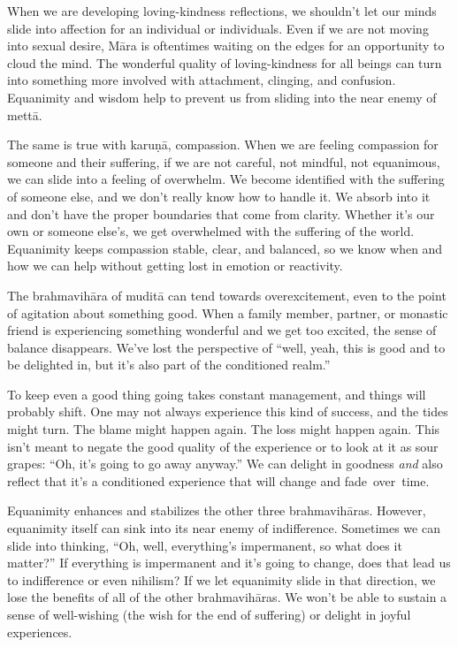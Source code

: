 When we are developing loving-kindness reflections, we shouldn't let our minds slide into affection for an individual or individuals. Even if we are not moving into sexual desire, Māra is oftentimes waiting on the edges for an opportunity to cloud the mind. The wonderful quality of loving-kindness for all beings can turn into something more involved with attachment, clinging, and confusion. Equanimity and wisdom help to prevent us from sliding into the near enemy of mettā.

The same is true with karuṇā, compassion. When we are feeling compassion for someone and their suffering, if we are not careful, not mindful, not equanimous, we can slide into a feeling of overwhelm. We become identified with the suffering of someone else, and we don't really know how to handle it. We absorb into it and don't have the proper boundaries that come from clarity. Whether it's our own or someone else's, we get overwhelmed with the suffering of the world. Equanimity keeps compassion stable, clear, and balanced, so we know when and how we can help without getting lost in emotion or reactivity.

The brahmavihāra of muditā can tend towards overexcitement, even to the point of agitation about something good. When a family member, partner, or monastic friend is experiencing something wonderful and we get too excited, the sense of balance disappears. We've lost the perspective of ``well, yeah, this is good and to be delighted in, but it's also part of the conditioned realm.''

To keep even a good thing going takes constant management, and things will probably shift. One may not always experience this kind of success, and the tides might turn. The blame might happen again. The loss might happen again. This isn't meant to negate the good quality of the experience or to look at it as sour grapes: ``Oh, it's going to go away anyway.'' We can delight in goodness \emph{and} also reflect that it's a conditioned experience that will change and \mbox{fade over time.}

Equanimity enhances and stabilizes the other three brahmavihāras. However, equanimity itself can sink into its near enemy of indifference. Sometimes we can slide into thinking, \linebreak ``Oh, well, everything's impermanent, so what does it matter?'' If everything is impermanent and it's going to change, does that lead us to indifference or even nihilism? If we let equanimity slide in that direction, we lose the benefits of all of the other brahmavihāras. We won't be able to sustain a sense of well-wishing (the wish for the end of suffering) or delight in joyful experiences.

